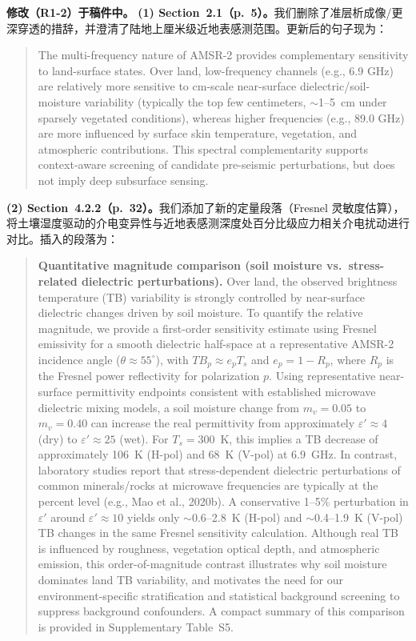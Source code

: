 \documentclass[11pt]{article}
\newcommand{\revchange}[1]{\begingroup\color{changecolor}#1\endgroup}
\begin{document}
\revchange{%
\textbf{修改（R1-2）于稿件中。}
\textbf{(1) Section~2.1（p.~5）。}我们删除了准层析成像/更深穿透的措辞，并澄清了陆地上厘米级近地表感测范围。更新后的句子现为：
\begin{quote}
The multi-frequency nature of AMSR-2 provides complementary sensitivity to land-surface states. Over land, low-frequency channels (e.g., 6.9 GHz) are relatively more sensitive to cm-scale near-surface dielectric/soil-moisture variability (typically the top few centimeters, $\sim$1--5~cm under sparsely vegetated conditions), whereas higher frequencies (e.g., 89.0 GHz) are more influenced by surface skin temperature, vegetation, and atmospheric contributions. This spectral complementarity supports context-aware screening of candidate pre-seismic perturbations, but does not imply deep subsurface sensing.
\end{quote}

\medskip

\textbf{(2) Section~4.2.2（p.~32）。}我们添加了新的定量段落（Fresnel 灵敏度估算），将土壤湿度驱动的介电变异性与近地表感测深度处百分比级应力相关介电扰动进行对比。插入的段落为：
\begin{quote}
\textbf{Quantitative magnitude comparison (soil moisture vs.\ stress-related dielectric perturbations).} Over land, the observed brightness temperature (TB) variability is strongly controlled by near-surface dielectric changes driven by soil moisture. To quantify the relative magnitude, we provide a first-order sensitivity estimate using Fresnel emissivity for a smooth dielectric half-space at a representative AMSR-2 incidence angle ($\theta \approx 55^{\circ}$), with $TB_p \approx e_p T_s$ and $e_p = 1 - R_p$, where $R_p$ is the Fresnel power reflectivity for polarization $p$. Using representative near-surface permittivity endpoints consistent with established microwave dielectric mixing models, a soil moisture change from $m_v = 0.05$ to $m_v = 0.40$ can increase the real permittivity from approximately $\varepsilon' \approx 4$ (dry) to $\varepsilon' \approx 25$ (wet). For $T_s = 300$~K, this implies a TB decrease of approximately 106~K (H-pol) and 68~K (V-pol) at 6.9~GHz. In contrast, laboratory studies report that stress-dependent dielectric perturbations of common minerals/rocks at microwave frequencies are typically at the percent level (e.g., Mao et al., 2020b). A conservative 1--5\% perturbation in $\varepsilon'$ around $\varepsilon' \approx 10$ yields only $\sim$0.6--2.8~K (H-pol) and $\sim$0.4--1.9~K (V-pol) TB changes in the same Fresnel sensitivity calculation. Although real TB is influenced by roughness, vegetation optical depth, and atmospheric emission, this order-of-magnitude contrast illustrates why soil moisture dominates land TB variability, and motivates the need for our environment-specific stratification and statistical background screening to suppress background confounders. A compact summary of this comparison is provided in Supplementary Table~S5.
\end{quote}

}
\end{document}
